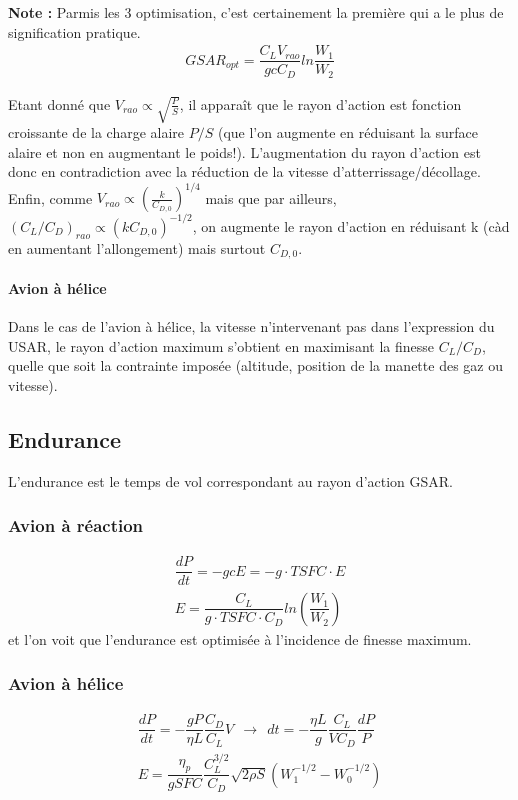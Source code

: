 \documentclass{report}
\begin{document}
\textbf{Note :} Parmis les 3 optimisation, c'est certainement la première qui a le plus de signification pratique.\\
\begin{eqnarray}
GSAR_{opt} = \dfrac{C_L V_{rao}}{gcC_D}ln\dfrac{W_1}{W_2}
\end{eqnarray}

Etant donné que $V_{rao}\propto\sqrt{\frac{P}{S}}$, il apparaît que le rayon d'action est fonction croissante de la charge alaire $P/S$ (que l'on augmente en réduisant la surface alaire et non en augmentant le poids!). L'augmentation du rayon d'action est donc en contradiction avec la réduction de la vitesse d'atterrissage/décollage. Enfin, comme $V_{rao}\propto(\frac{k}{C_{D,0}})^{1/4}$ mais que par ailleurs, $(C_L/C_D)_{rao}\propto (kC_{D,0})^{-1/2}$, on augmente le rayon d'action en réduisant k (càd en aumentant l'allongement) mais surtout $C_{D,0}$.

\paragraph{Avion à hélice} Dans le cas de l’avion à hélice, la vitesse n’intervenant pas dans l’expression du USAR, le rayon d’action maximum s’obtient en maximisant la finesse $C_L/C_D$, quelle que soit la contrainte imposée (altitude, position de la manette des gaz ou vitesse).

\subsection{Endurance}

L’endurance est le temps de vol correspondant au rayon d’action GSAR. 

\subsubsection{Avion à réaction}
\begin{eqnarray}
\dfrac{dP}{dt}=-gcE=-g\cdot TSFC\cdot E\\
E=\dfrac{C_L}{g\cdot TSFC\cdot C_D}ln(\dfrac{W_1}{W_2})
\end{eqnarray}
et l’on voit que l’endurance est optimisée à l’incidence de finesse maximum.

\subsubsection{Avion à hélice}

\begin{eqnarray}
\dfrac{dP}{dt}=-\dfrac{gP}{\eta L}\dfrac{C_D}{C_L}V~~\rightarrow~~dt=-\dfrac{\eta L}{g}\dfrac{C_L}{VC_D}\dfrac{dP}{P}\\
E=\dfrac{\eta_p}{gSFC}\dfrac{C_L^{3/2}}{C_D}\sqrt{2\rho S}(W_1^{-1/2}-W_0^{-1/2})
\end{eqnarray}
\end{document}

